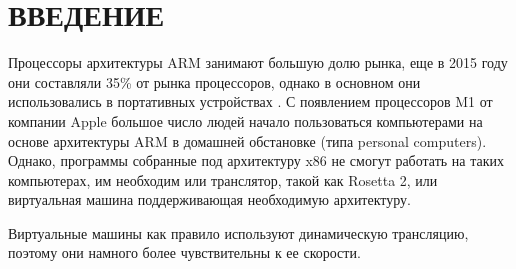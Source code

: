 \section*{ВВЕДЕНИЕ}

Процессоры архитектуры ARM занимают большую долю рынка, еще в 2015 году они составляли 35\% от рынка процессоров, однако в основном они использовались в портативных устройствах \cite{arm_report}.  С появлением процессоров M1 от компании Apple большое число людей начало пользоваться компьютерами на основе архитектуры ARM в домашней обстановке (типа personal computers). Однако, программы собранные под архитектуру x86 не смогут работать на таких компьютерах, им необходим или транслятор, такой как Rosetta 2, или виртуальная машина поддерживающая необходимую архитектуру.

Виртуальные машины как правило используют динамическую трансляцию, поэтому они намного более чувствительны к ее скорости.

\pagebreak
